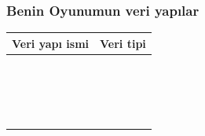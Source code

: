 \documentclass[12pt, a4paper]{article}
\begin{document}
\subsubsection*{Benin Oyunumun veri yapılar}
\begin{tabular}{| p{4cm} | p{11cm} |  }
\hline			
Veri yapı ismi&Veri tipi\\
\hline
& \\[2ex]
\hline  
& \\[2ex]
\hline  
& \\[2ex]
\hline  
& \\[2ex]
\hline  
& \\[2ex]
\hline  
& \\[2ex]
\hline  
& \\[2ex]
\hline  
& \\[2ex]
\hline  
& \\[2ex]
\hline  
& \\[2ex]
\hline  
& \\[2ex]
\hline  
& \\[2ex]
\hline  
& \\[2ex]
\hline  
& \\[2ex]
\hline  
& \\[2ex]
\hline  
& \\[2ex]
\hline  
& \\[2ex]
\hline  
& \\[2ex]
\hline  
\end{tabular}

\veriyapi{ }

\veriyapi{ }

\veriyapi{ }

\veriyapi{ }

\veriyapi{ }

\veriyapi{ }

\veriyapi{ }

\veriyapi{ }

\veriyapi{ }

\veriyapi{ }

\veriyapi{ }

\veriyapi{ }

\veriyapi{ }







\end{document}
